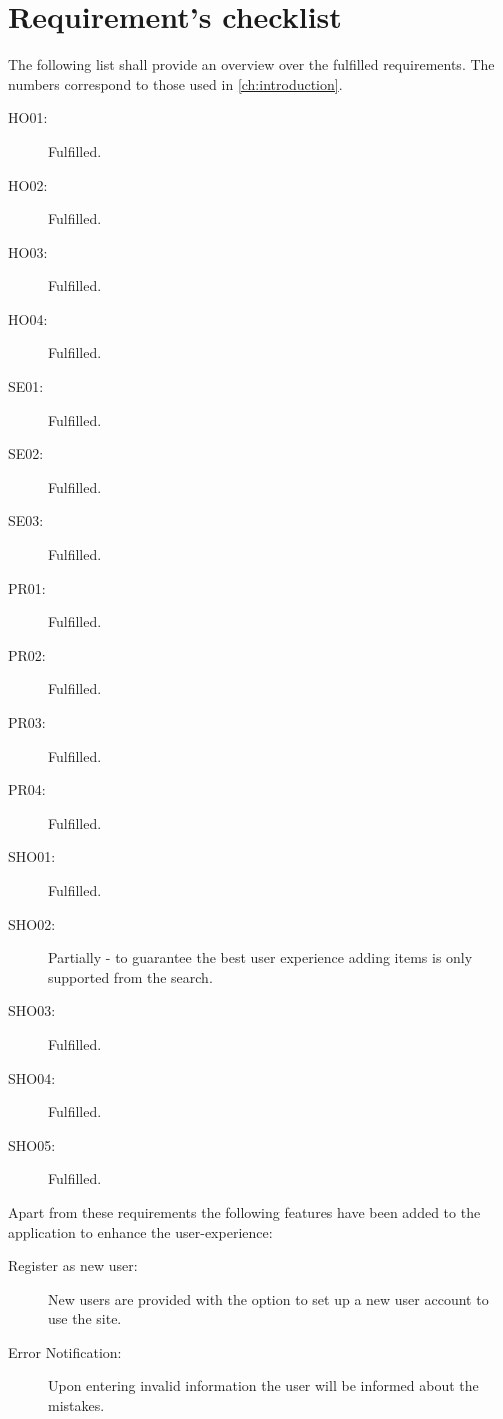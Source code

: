 \chapter{Requirement's checklist}\label{ch:requirements} %

The following list shall provide an overview over the fulfilled requirements.
The numbers correspond to those used in \autoref{ch:introduction}.

\begin{description}
\item[HO01:] Fulfilled.
\item[HO02:] Fulfilled.
\item[HO03:] Fulfilled.
\item[HO04:] Fulfilled.
\item[SE01:] Fulfilled.
\item[SE02:] Fulfilled.
\item[SE03:] Fulfilled.
\item[PR01:] Fulfilled.
\item[PR02:] Fulfilled.
\item[PR03:] Fulfilled.
\item[PR04:] Fulfilled.
\item[SHO01:] Fulfilled.
\item[SHO02:] Partially - to guarantee the best user experience adding items is only supported from the search.
\item[SHO03:] Fulfilled.
\item[SHO04:] Fulfilled.
\item[SHO05:] Fulfilled.
\end{description}

Apart from these requirements the following features have been added to the application to enhance the user-experience:

\begin{description}
\item[Register as new user:] New users are provided with the option to set up a new user account to use the site.
\item[Error Notification:] Upon entering invalid information the user will be informed about the mistakes.
\end{description}